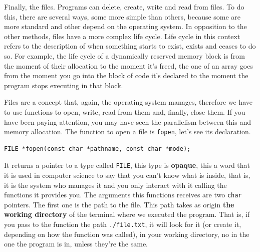 \documentclass[a4paper]{article}
\begin{document}
Finally, the files. Programs can delete, create, write and read from files.
To do this, there are several ways, some more simple than others, because some
are more standard and other depend on the operating system. In opposition to the
other methods, files have a more complex life cycle. Life cycle in this context
refers to the description of when something starts to exist, exists and ceases
to do so. For example, the life cycle of a dynamically reserved memory block is
from the moment of their allocation to the moment it's freed, the one of an
array goes from the moment you go into the block of code it's declared to the
moment the program stops executing in that block.

Files are a concept that, again, the operating system manages, therefore we have
to use functions to open, write, read from them and, finally, close them. If you
have been paying attention, you may have seen the parallelism between this and
memory allocation. The function to open a file is \lstinline[style=C]!fopen!,
let's see its declaration.

\noindent
\begin{minipage}[H]{\linewidth}
\mbox{}
\begin{lstlisting}[style=C,
caption={\texttt{fopen} function declaration},
label={lst:callocSignature}]
FILE *fopen(const char *pathname, const char *mode);
\end{lstlisting}
\end{minipage}

It returns a pointer to a type called \verb!FILE!, this type is \textbf{opaque},
this a word that it is used in computer science to say that you can't know what
is inside, that is, it is the system who manages it and you only interact with
it calling the functions it provides you. The arguments this functions receives
are two \texttt{char} pointers. The first one is the path to the file. This path
takes as origin \textbf{the working directory} of the terminal where we
executed the program. That is, if you pass to the function the path
\verb!./file.txt!, it will look for it (or create it, depending on how the
function was called), in your working directory, no in the one the program is
in, unless they're the same.
\end{document}
